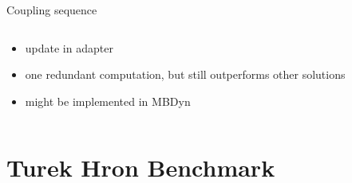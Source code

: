 \documentclass[10pt,t]{beamer}
\begin{document}
\begin{frame}{Coupling sequence}
\begin{columns}
\begin{column}{0.5\textwidth}
\pause

\vspace{0.5cm}

\begin{itemize}
    \item update in adapter
    \item one redundant computation, but still outperforms other solutions
    \item might be implemented in MBDyn
\end{itemize}


\end{column}


\end{columns}

    
\end{frame}



\section{Turek Hron Benchmark}
\end{document}
